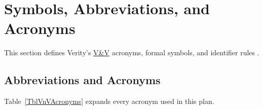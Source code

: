 \documentclass[12pt, titlepage]{article}
\newcommand{\VnV}{\hyperlink{vnv-acr-vnv}{V\&V}}
\begin{document}
\newpage

\tableofcontents
\listoftables
\listoffigures

\newpage

\section{Symbols, Abbreviations, and Acronyms}\label{sec:symbols-acronyms}

This section defines Verity's \VnV{} acronyms, formal symbols, and identifier rules \cite{VeritySRS2026}.

\subsection{Abbreviations and Acronyms}\label{subsec:acronyms}

Table~\ref{TblVnVAcronyms} expands every acronym used in this plan.
\end{document}
